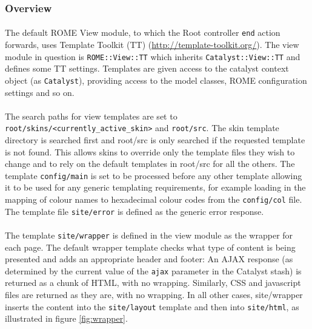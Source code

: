 \subsubsection{Overview}
\label{sec:view_overview}

\paragraph{}
The default ROME View module, to which the Root controller \texttt{end} action forwards, uses Template Toolkit (TT) (\url{http://template-toolkit.org/}). The view module in question is \texttt{ROME::View::TT} which inherits \texttt{Catalyst::View::TT} and defines some TT settings. Templates are given access to the catalyst context object (as \texttt{Catalyst}), providing access to the model classes, ROME configuration settings and so on. 

\paragraph{}
The search paths for view templates are set to \texttt{root/skins/<currently\_active\_skin>} and \texttt{root/src}. The skin template directory is searched first and root/src is only searched if the requested template is not found. This allows skins to override only the template files they wish to change and to rely on the default templates in root/src for all the others. The template \texttt{config/main} is set to be processed before any other template allowing it to be used for any generic templating requirements, for example loading in the mapping of colour names to hexadecimal colour codes from the \texttt{config/col} file. The template file \texttt{site/error} is defined as the generic error response.

\paragraph{}
The template \texttt{site/wrapper} is defined in the view module as the wrapper for each page. The default wrapper template checks what type of content is being presented and adds an appropriate header and footer: An AJAX response (as determined by the current value of the \texttt{ajax} parameter in the Catalyst stash) is returned as a chunk of HTML, with no wrapping. Similarly, CSS and javascript files are returned as they are, with no wrapping. In all other cases, site/wrapper inserts the content into the \texttt{site/layout} template and then into \texttt{site/html}, as illustrated in figure \ref{fig:wrapper}. 


